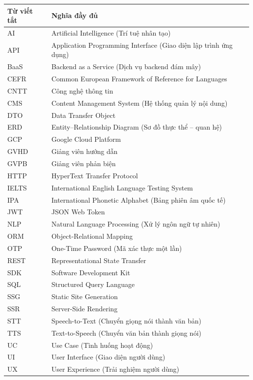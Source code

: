 \documentclass[a4paper,12pt]{extreport}
\begin{document}
\begin{center}
\begin{tabular}{l p{10cm}}
    \hline
    \textbf{Từ viết tắt} & \textbf{Nghĩa đầy đủ} \\
    \hline
    AI      & Artificial Intelligence (Trí tuệ nhân tạo) \\
    API     & Application Programming Interface (Giao diện lập trình ứng dụng) \\
    BaaS    & Backend as a Service (Dịch vụ backend đám mây) \\
    CEFR    & Common European Framework of Reference for Languages \\
    CNTT    & Công nghệ thông tin \\
    CMS     & Content Management System (Hệ thống quản lý nội dung) \\
    DTO     & Data Transfer Object \\
    ERD     & Entity–Relationship Diagram (Sơ đồ thực thể – quan hệ) \\
    GCP     & Google Cloud Platform \\
    GVHD   & Giảng viên hướng dẫn \\
    GVPB   & Giảng viên phản biện \\
    HTTP    & HyperText Transfer Protocol \\
    IELTS   & International English Language Testing System \\
    IPA     & International Phonetic Alphabet (Bảng phiên âm quốc tế) \\
    JWT     & JSON Web Token \\
    NLP     & Natural Language Processing (Xử lý ngôn ngữ tự nhiên) \\
    ORM     & Object-Relational Mapping \\
    OTP     & One-Time Password (Mã xác thực một lần) \\
    REST    & Representational State Transfer \\
    SDK     & Software Development Kit \\
    SQL     & Structured Query Language \\
    SSG     & Static Site Generation \\
    SSR     & Server-Side Rendering \\
    STT     & Speech-to-Text (Chuyển giọng nói thành văn bản) \\
    TTS     & Text-to-Speech (Chuyển văn bản thành giọng nói) \\
    UC      & Use Case (Tình huống hoạt động) \\
    UI      & User Interface (Giao diện người dùng) \\
    UX      & User Experience (Trải nghiệm người dùng) \\
    \hline
\end{tabular}
\end{center}
\end{document}
